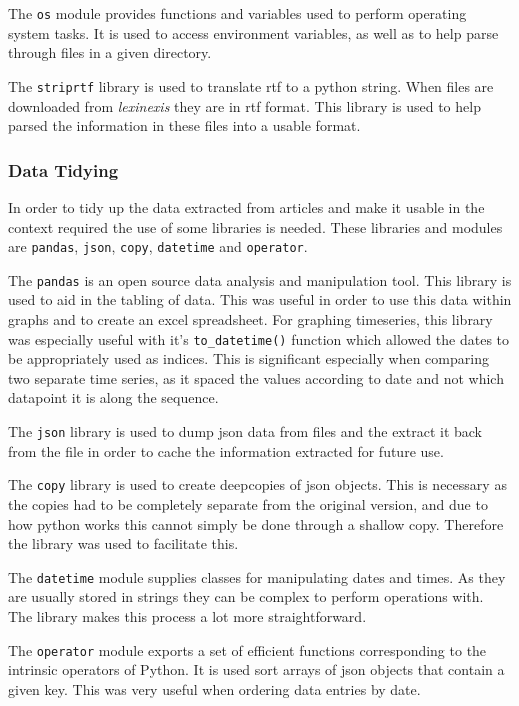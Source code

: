 The \verb|os| module provides functions and variables used to perform operating system tasks. It is used to access environment variables, as well as to help parse through files in a given directory.

The \verb|striprtf| library is used to translate rtf to a python string. When files are downloaded from \emph{lexinexis} they are in rtf format. This library is used to help parsed the information in these files into a usable format.

\subsubsection{Data Tidying}

In order to tidy up the data extracted from articles and make it usable in the context required the use of some libraries is needed. These libraries and modules are \verb|pandas|, \verb|json|, \verb|copy|, \verb|datetime| and \verb|operator|.

The \verb|pandas| is an open source data analysis and manipulation tool. This library is used to aid in the tabling of data. This was useful in order to use this data within graphs and to create an excel spreadsheet. For graphing timeseries, this library was especially useful with it's \verb|to_datetime()| function which allowed the dates to be appropriately used as indices. This is significant especially when comparing two separate time series, as it spaced the values according to date and not which datapoint it is along the sequence.

The \verb|json| library is used to dump json data from files and the extract it back from the file in order to cache the information extracted for future use.

The \verb|copy| library is used to create deepcopies of json objects. This is necessary as the copies had to be completely separate from the original version, and due to how python works this cannot simply be done through a shallow copy. Therefore the library was used to facilitate this.

The \verb|datetime| module supplies classes for manipulating dates and times. As they are usually stored in strings they can be complex to perform operations with. The library makes this process a lot more straightforward.

The \verb|operator| module exports a set of efficient functions corresponding to the intrinsic operators of Python. It is used sort arrays of json objects that contain a given key. This was very useful when ordering data entries by date.

